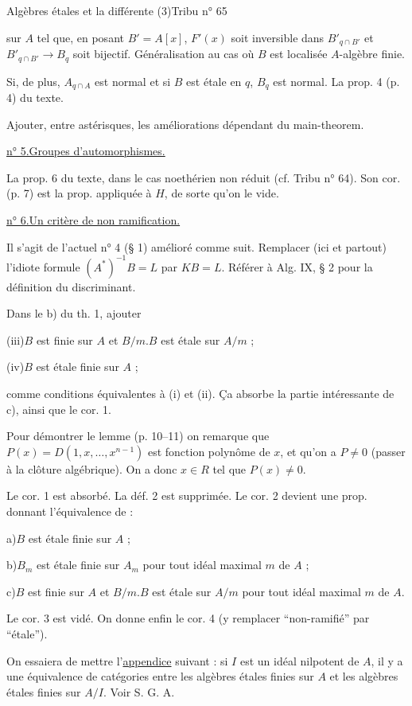 

Algèbres étales et la différente (3)\hfill Tribu n° 65

sur $A$ tel que, en posant $B'=A[x]$, $F'(x)$ soit inversible dans $B'_{q\cap B'}$ et $B'_{q\cap B'}\to B_q$ soit bijectif. Généralisation au cas où $B$ est localisée  $A$-algèbre finie.

Si, de plus, $A_{q\cap A}$ est normal et si $B$ est étale en $q$, $B_q$ est normal. La prop. 4 (p. 4) du texte.

Ajouter, entre astérisques, les améliorations dépendant du main-theorem.

\uline{n° 5.}\quad \uline{Groupes d'automorphismes.}

La prop. 6 du texte, dans le cas noethérien non réduit (cf. Tribu n° 64). Son cor. (p. 7) est la prop. appliquée à $H$, de sorte qu'on le vide.

\uline{n° 6.}\quad \uline{Un critère de non ramification.}

Il s'agit de l'actuel n° 4 (§ 1) amélioré comme suit. Remplacer (ici et partout) l'idiote formule $(A^*)^{-1}B=L$ par $KB=L$. Référer à Alg. IX, § 2 pour la définition du discriminant.

Dans le b) du th. 1, ajouter

(iii)\quad $B$ est finie sur $A$ et $B/m.B$ est étale sur $A/m$ ;

(iv)\quad $B$ est étale finie sur $A$ ;

comme conditions équivalentes à (i) et (ii). Ça absorbe la partie intéressante de c), ainsi que le cor. 1.

Pour démontrer le lemme (p. 10--11) on remarque que $P(x)=D(1,x,\ldots,x^{n-1})$ est fonction polynôme de $x$, et qu'on a $P\neq0$ (passer à la clôture algébrique). On a donc $x\in R$ tel que $P(x)\neq0$.

Le cor. 1 est absorbé. La déf. 2 est supprimée. Le cor. 2 devient une prop. donnant l'équivalence de :

a)\quad $B$ est étale finie sur $A$ ;

b)\quad $B_m$ est étale finie sur $A_m$ pour tout idéal maximal $m$ de $A$ ;

c)\quad $B$ est finie sur $A$ et $B/m.B$ est étale sur $A/m$ pour tout idéal maximal $m$ de $A$.

Le cor. 3 est vidé. On donne enfin le cor. 4 (y remplacer ``non-ramifié'' par ``étale'').

On essaiera de mettre l'\uline{appendice} suivant : si $I$ est un idéal nilpotent de $A$, il y a une équivalence de catégories entre les algèbres étales finies sur $A$ et les algèbres étales finies sur $A/I$. Voir S. G. A.

